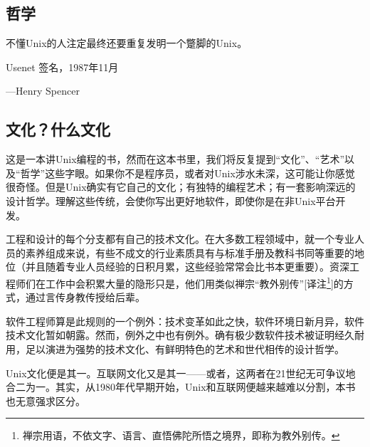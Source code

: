 \documentclass[12pt,oneside]{book}
\begin{document}
\frontmatter   

\author{Eric S. Raymond}
\titleLC


\setcounter{tocdepth}{2}    
\tableofcontents

\begin{common-format}
\mainmatter 

\chapter{哲学}

\begin{flushright}
\begin{notecard}{17em}
不懂Unix的人注定最终还要重复发明一个蹩脚的Unix。

{\hfill Usenet 签名，1987年11月}

{\hfill —Henry Spencer}
\end{notecard}
\end{flushright}


\section{文化？什么文化}
这是一本讲Unix编程的书，然而在这本书里，我们将反复提到“文化”、“艺术”以及“哲学”这些字眼。如果你不是程序员，或者对Unix涉水未深，这可能让你感觉很奇怪。但是Unix确实有它自己的文化；有独特的编程艺术；有一套影响深远的设计哲学。理解这些传统，会使你写出更好地软件，即使你是在非Unix平台开发。

工程和设计的每个分支都有自己的技术文化。在大多数工程领域中，就一个专业人员的素养组成来说，有些不成文的行业素质具有与标准手册及教科书同等重要的地位（并且随着专业人员经验的日积月累，这些经验常常会比书本更重要）。资深工程师们在工作中会积累大量的隐形只是，他们用类似禅宗“教外别传”[译注\footnote{禅宗用语，不依文字、语言、直悟佛陀所悟之境界，即称为教外别传。}]的方式，通过言传身教传授给后辈。

软件工程师算是此规则的一个例外：技术变革如此之快，软件环境日新月异，软件技术文化暂如朝露。然而，例外之中也有例外。确有极少数软件技术被证明经久耐用，足以演进为强势的技术文化、有鲜明特色的艺术和世代相传的设计哲学。

Unix文化便是其一。互联网文化又是其一——或者，这两者在21世纪无可争议地合二为一。其实，从1980年代早期开始，Unix和互联网便越来越难以分割，本书也无意强求区分。



\end{common-format}
\end{document}
